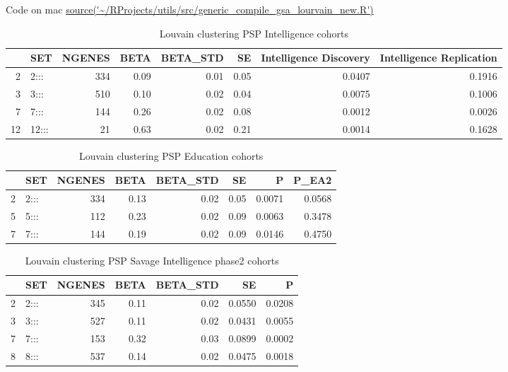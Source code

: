 Code on mac \url{source('~/RProjects/utils/src/generic_compile_gsa_lourvain_new.R')}
\begin{table}[ht]
\centering
\begin{tabular}{rlrrrrrr}
  \hline
 & SET & NGENES & BETA & BETA\_STD & SE & Intelligence Discovery & Intelligence Replication \\ 
  \hline
2 & 2::: & 334 & 0.09 & 0.01 & 0.05 & 0.0407 & 0.1916 \\ 
  3 & 3::: & 510 & 0.10 & 0.02 & 0.04 & 0.0075 & 0.1006 \\ 
  7 & 7::: & 144 & 0.26 & 0.02 & 0.08 & 0.0012 & 0.0026 \\ 
  12 & 12::: & 21 & 0.63 & 0.02 & 0.21 & 0.0014 & 0.1628 \\ 
   \hline
\end{tabular}
\caption{Louvain clustering PSP Intelligence cohorts}
\label{tab:Louvain clustering intelligence}
\end{table}


\begin{table}[ht]
\centering
\begin{tabular}{rlrrrrrr}
  \hline
 & SET & NGENES & BETA & BETA\_STD & SE & P & P\_EA2 \\ 
  \hline
2 & 2::: & 334 & 0.13 & 0.02 & 0.05 & 0.0071 & 0.0568 \\ 
  5 & 5::: & 112 & 0.23 & 0.02 & 0.09 & 0.0063 & 0.3478 \\ 
  7 & 7::: & 144 & 0.19 & 0.02 & 0.09 & 0.0146 & 0.4750 \\ 
   \hline
\end{tabular}
\caption{Louvain clustering PSP Education cohorts}
\label{tab:Louvain clustering education}
\end{table}

\begin{table}[ht]
\centering
\begin{tabular}{rlrrrrr}
  \hline
 & SET & NGENES & BETA & BETA\_STD & SE & P \\ 
  \hline
2 & 2::: & 345 & 0.11 & 0.02 & 0.0550 & 0.0208 \\ 
  3 & 3::: & 527 & 0.11 & 0.02 & 0.0431 & 0.0055 \\ 
  7 & 7::: & 153 & 0.32 & 0.03 & 0.0899 & 0.0002 \\ 
  8 & 8::: & 537 & 0.14 & 0.02 & 0.0475 & 0.0018 \\ 
   \hline
\end{tabular}
\caption{Louvain clustering PSP Savage Intelligence phase2 cohorts}
\label{tab:Louvain clustering Savage intelligence phase 2 cohorts}
\end{table}


